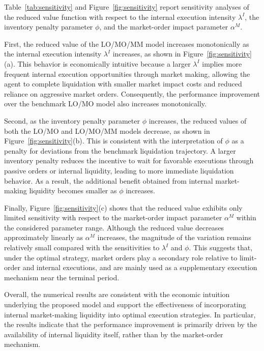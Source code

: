 \documentclass[12pt]{article}
\begin{document}
Table~\ref{tab:sensitivity} and Figure~\ref{fig:sensitivity}
report sensitivity analyses of the reduced value function
with respect to the internal execution intensity $\lambda^I$,
the inventory penalty parameter $\phi$,
and the market-order impact parameter $\alpha^M$.

First, the reduced value of the LO/MO/MM model increases
monotonically as the internal execution intensity $\lambda^I$
increases, as shown in Figure~\ref{fig:sensitivity}(a).
This behavior is economically intuitive because a larger
$\lambda^I$ implies more frequent internal execution opportunities
through market making, allowing the agent to complete liquidation
with smaller market impact costs and reduced reliance on aggressive
market orders.
Consequently, the performance improvement over the benchmark
LO/MO model also increases monotonically.

Second, as the inventory penalty parameter $\phi$ increases,
the reduced values of both the LO/MO and LO/MO/MM models decrease,
as shown in Figure~\ref{fig:sensitivity}(b).
This is consistent with the interpretation of $\phi$
as a penalty for deviations from the benchmark liquidation trajectory.
A larger inventory penalty reduces the incentive to wait for favorable
executions through passive orders or internal liquidity,
leading to more immediate liquidation behavior.
As a result, the additional benefit obtained from internal
market-making liquidity becomes smaller as $\phi$ increases.

Finally, Figure~\ref{fig:sensitivity}(c) shows that the reduced value
exhibits only limited sensitivity with respect to the market-order
impact parameter $\alpha^M$ within the considered parameter range.
Although the reduced value decreases approximately linearly as
$\alpha^M$ increases, the magnitude of the variation remains relatively
small compared with the sensitivities to $\lambda^I$ and $\phi$.
This suggests that, under the optimal strategy,
market orders play a secondary role relative to limit-order and
internal executions, and are mainly used as a supplementary execution
mechanism near the terminal period.

Overall, the numerical results are consistent with the economic
intuition underlying the proposed model and support the effectiveness
of incorporating internal market-making liquidity into optimal
execution strategies.
In particular, the results indicate that the performance improvement
is primarily driven by the availability of internal liquidity itself,
rather than by the market-order mechanism.
\end{document}
